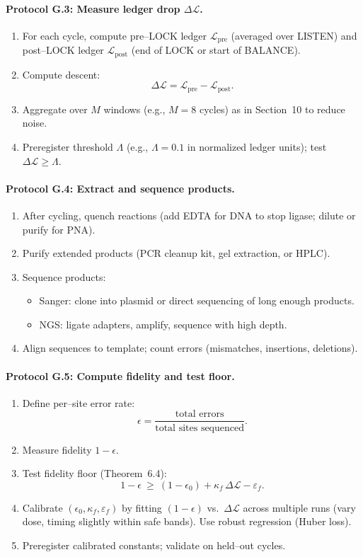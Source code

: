 \documentclass[11pt]{article}
\begin{document}
\paragraph{Protocol G.3: Measure ledger drop $\Delta\mathcal{L}$.}
\begin{enumerate}
\item For each cycle, compute pre–LOCK ledger $\mathcal{L}_{\mathrm{pre}}$ (averaged over \textsf{LISTEN}) and post–LOCK ledger $\mathcal{L}_{\mathrm{post}}$ (end of \textsf{LOCK} or start of \textsf{BALANCE}).
\item Compute descent:
\[
\Delta\mathcal{L}=\mathcal{L}_{\mathrm{pre}}-\mathcal{L}_{\mathrm{post}}.
\]
\item Aggregate over $M$ windows (e.g., $M=8$ cycles) as in Section~10 to reduce noise.
\item Preregister threshold $\Lambda$ (e.g., $\Lambda=0.1$ in normalized ledger units); test $\Delta\mathcal{L}\ge\Lambda$.
\end{enumerate}

\paragraph{Protocol G.4: Extract and sequence products.}
\begin{enumerate}
\item After cycling, quench reactions (add EDTA for DNA to stop ligase; dilute or purify for PNA).
\item Purify extended products (PCR cleanup kit, gel extraction, or HPLC).
\item Sequence products:
\begin{itemize}
\item Sanger: clone into plasmid or direct sequencing of long enough products.
\item NGS: ligate adapters, amplify, sequence with high depth.
\end{itemize}
\item Align sequences to template; count errors (mismatches, insertions, deletions).
\end{enumerate}

\paragraph{Protocol G.5: Compute fidelity and test floor.}
\begin{enumerate}
\item Define per–site error rate:
\[
\epsilon=\frac{\text{total errors}}{\text{total sites sequenced}}.
\]
\item Measure fidelity $1-\epsilon$.
\item Test fidelity floor (Theorem~6.4):
\[
1-\epsilon\ \ge\ (1-\epsilon_0)+\kappa_f\,\Delta\mathcal{L}-\varepsilon_f.
\]
\item Calibrate $(\epsilon_0,\kappa_f,\varepsilon_f)$ by fitting $(1-\epsilon)$ vs.\ $\Delta\mathcal{L}$ across multiple runs (vary dose, timing slightly within safe bands). Use robust regression (Huber loss).
\item Preregister calibrated constants; validate on held–out cycles.
\end{enumerate}
\end{document}
